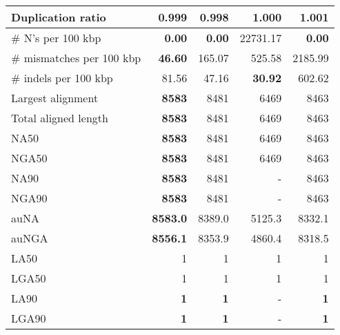 \documentclass[12pt,a4paper]{article}
\begin{document}
\begin{table}[ht]
\begin{center}
\begin{tabular}{|l*{4}{|r}|}
Duplication ratio & 0.999 & {\bf 0.998} & 1.000 & 1.001 \\ \hline
\# N's per 100 kbp & {\bf 0.00} & {\bf 0.00} & 22731.17 & {\bf 0.00} \\ \hline
\# mismatches per 100 kbp & {\bf 46.60} & 165.07 & 525.58 & 2185.99 \\ \hline
\# indels per 100 kbp & 81.56 & 47.16 & {\bf 30.92} & 602.62 \\ \hline
Largest alignment & {\bf 8583} & 8481 & 6469 & 8463 \\ \hline
Total aligned length & {\bf 8583} & 8481 & 6469 & 8463 \\ \hline
NA50 & {\bf 8583} & 8481 & 6469 & 8463 \\ \hline
NGA50 & {\bf 8583} & 8481 & 6469 & 8463 \\ \hline
NA90 & {\bf 8583} & 8481 & - & 8463 \\ \hline
NGA90 & {\bf 8583} & 8481 & - & 8463 \\ \hline
auNA & {\bf 8583.0} & 8389.0 & 5125.3 & 8332.1 \\ \hline
auNGA & {\bf 8556.1} & 8353.9 & 4860.4 & 8318.5 \\ \hline
LA50 & 1 & 1 & 1 & 1 \\ \hline
LGA50 & 1 & 1 & 1 & 1 \\ \hline
LA90 & {\bf 1} & {\bf 1} & - & {\bf 1} \\ \hline
LGA90 & {\bf 1} & {\bf 1} & - & {\bf 1} \\ \hline
\end{tabular}
\end{center}
\end{table}
\end{document}
